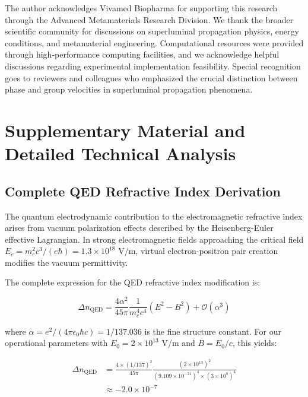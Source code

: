 \documentclass[aps,prl,reprint,groupedaddress,floatfix]{revtex4-1}
\begin{document}
\begin{acknowledgments}
The author acknowledges Vivamed Biopharma for supporting this research through the Advanced Metamaterials Research Division. We thank the broader scientific community for discussions on superluminal propagation physics, energy conditions, and metamaterial engineering. Computational resources were provided through high-performance computing facilities, and we acknowledge helpful discussions regarding experimental implementation feasibility. Special recognition goes to reviewers and colleagues who emphasized the crucial distinction between phase and group velocities in superluminal propagation phenomena.
\end{acknowledgments}



\appendix

\section{Supplementary Material and Detailed Technical Analysis}

\subsection{Complete QED Refractive Index Derivation}

The quantum electrodynamic contribution to the electromagnetic refractive index arises from vacuum polarization effects described by the Heisenberg-Euler effective Lagrangian. In strong electromagnetic fields approaching the critical field $E_c = m_e^2 c^3/(e\hbar) = 1.3 \times 10^{18}$ V/m, virtual electron-positron pair creation modifies the vacuum permittivity.

The complete expression for the QED refractive index modification is:

\begin{equation}
\Delta n_{\text{QED}} = \frac{4\alpha^2}{45\pi} \frac{1}{m_e^4 c^4} (E^2 - B^2) + \mathcal{O}(\alpha^3) \label{eq:qed_complete}
\end{equation}

where $\alpha = e^2/(4\pi\epsilon_0\hbar c) = 1/137.036$ is the fine structure constant. For our operational parameters with $E_0 = 2 \times 10^{13}$ V/m and $B = E_0/c$, this yields:

\begin{align}
\Delta n_{\text{QED}} &= \frac{4 \times (1/137)^2}{45\pi} \frac{(2 \times 10^{13})^2}{(9.109 \times 10^{-31})^4 \times (3 \times 10^8)^4} \nonumber \\
&\approx -2.0 \times 10^{-7} \label{eq:qed_numerical}
\end{align}
\end{document}
